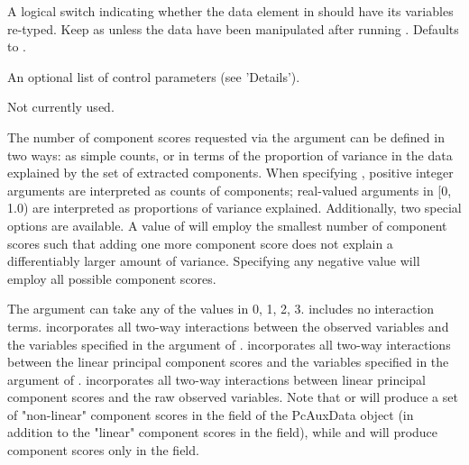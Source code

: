 \documentclass[letterpaper]{book}
\begin{document}
\begin{Arguments}
\begin{ldescription}
\item[\code{castData}] 
A logical switch indicating whether the data element in
 should have its variables re-typed. Keep as
 unless the data have been manipulated after running
. Defaults to .

\item[\code{control}] 
An optional list of control parameters (see 'Details').

\item[\code{...}] 
Not currently used.

\end{ldescription}
\end{Arguments}
%
\begin{Details}\relax
The number of component scores requested via the 
argument can be defined in two ways: as simple counts, or in terms of
the proportion of variance in the data explained by the set of
extracted components. When specifying , positive integer
arguments are interpreted as counts of components; real-valued
arguments in [0, 1.0) are interpreted as proportions of
variance explained. Additionally, two special options are available. A
value of  will employ the smallest number of component
scores such that adding one more component score does not explain a
differentiably larger amount of variance. Specifying any negative
value will employ all possible component scores.

The  argument can take any of the values in 0, 1, 2,
3.  includes no interaction terms.
 incorporates all two-way interactions between
the observed variables and the variables specified in the
 argument of .  incorporates all two-way interactions between the linear
principal component scores and the variables specified in the
 argument of .  incorporates all two-way interactions between linear principal
component scores and the raw observed variables. Note that
 or  will produce a
set of "non-linear" component scores in the  field
of the PcAuxData object (in addition to the "linear" component
scores in the  field), while  and  will produce component scores only
in the  field. 


\end{Details}
\end{document}
